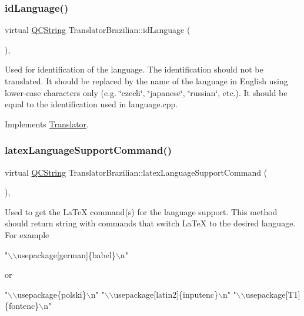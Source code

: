 \subsubsection{\texorpdfstring{idLanguage()}{idLanguage()}}
{\footnotesize\ttfamily virtual \mbox{\hyperlink{class_q_c_string}{Q\+C\+String}} Translator\+Brazilian\+::id\+Language (\begin{DoxyParamCaption}{ }\end{DoxyParamCaption})\hspace{0.3cm}{\ttfamily [inline]}, {\ttfamily [virtual]}}

Used for identification of the language. The identification should not be translated. It should be replaced by the name of the language in English using lower-\/case characters only (e.\+g. \char`\"{}czech\char`\"{}, \char`\"{}japanese\char`\"{}, \char`\"{}russian\char`\"{}, etc.). It should be equal to the identification used in language.\+cpp. 

Implements \mbox{\hyperlink{class_translator}{Translator}}.

\mbox{\label{class_translator_brazilian_a0d362c8895ea7e4aff87f885e73e46df}} 
\subsubsection{\texorpdfstring{latexLanguageSupportCommand()}{latexLanguageSupportCommand()}}
{\footnotesize\ttfamily virtual \mbox{\hyperlink{class_q_c_string}{Q\+C\+String}} Translator\+Brazilian\+::latex\+Language\+Support\+Command (\begin{DoxyParamCaption}{ }\end{DoxyParamCaption})\hspace{0.3cm}{\ttfamily [inline]}, {\ttfamily [virtual]}}

Used to get the La\+TeX command(s) for the language support. This method should return string with commands that switch La\+TeX to the desired language. For example 
\begin{DoxyPre}"\(\backslash\)\(\backslash\)usepackage[german]\{babel\}\(\backslash\)n"
 \end{DoxyPre}
 or 
\begin{DoxyPre}"\(\backslash\)\(\backslash\)usepackage\{polski\}\(\backslash\)n"
 "\(\backslash\)\(\backslash\)usepackage[latin2]\{inputenc\}\(\backslash\)n"
 "\(\backslash\)\(\backslash\)usepackage[T1]\{fontenc\}\(\backslash\)n"
 \end{DoxyPre}


